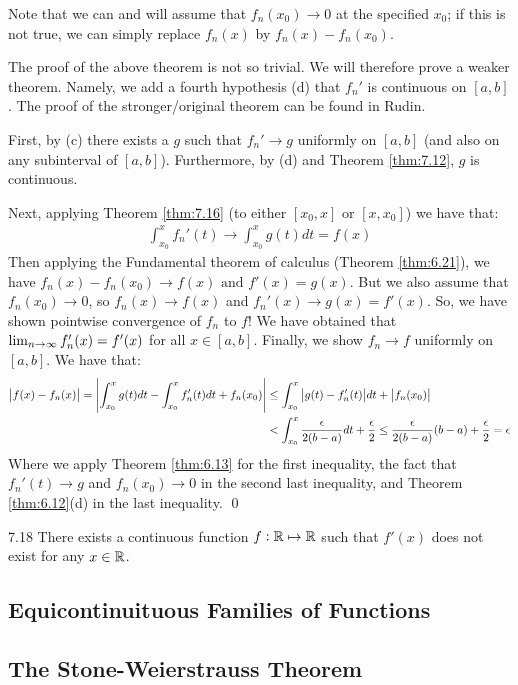 Note that we can and will assume that $f_n(x_0) \rightarrow 0$ at the specified $x_0$; if this is not true, we can simply replace $f_n(x)$ by $f_n(x) - f_n(x_0)$.

\begin{nproof}
    The proof of the above theorem is not so trivial. We will therefore prove a weaker theorem. Namely, we add a fourth hypothesis (d) that $f_n'$ is continuous on $[a, b]$. The proof of the stronger/original theorem can be found in Rudin.
    
    First, by (c) there exists a $g$ such that $f_n' \rightarrow g$ uniformly on $[a, b]$ (and also on any subinterval of $[a, b]$). Furthermore, by (d) and Theorem \ref{thm:7.12}, $g$ is continuous. 
    
    Next, applying Theorem \ref{thm:7.16} (to either $[x_0, x]$ or $[x, x_0]$) we have that:
    \begin{align*}
        \int_{x_0}^x f_n'(t) \rightarrow \int_{x_0}^x g(t) dt = f(x)
    \end{align*}
    Then applying the Fundamental theorem of calculus (Theorem \ref{thm:6.21}), we have $f_n(x) - f_n(x_0) \rightarrow f(x) \text{ and } f'(x) = g(x)$. But we also assume that $f_n(x_0) \rightarrow 0$, so $f_n(x) \rightarrow f(x)$ and $f_n'(x) \rightarrow g(x) = f'(x)$. So, we have shown pointwise convergence of $f_n$ to $f$! We have obtained that $\lim_{n \rightarrow \infty} f_n'(x) = f'(x)$ for all $x \in [a, b]$. Finally, we show $f_n \rightarrow f$ uniformly on $[a, b]$. We have that:
    \begin{align*}
        \abs{f(x) - f_n(x)} = \abs{\int_{x_0}^x g(t)dt - \int_{x_0}^x f_n'(t) dt + f_n(x_0)} &\leq \int_{x_0}^x \abs{g(t) - f_n'(t)}dt + \abs{f_n(x_0)}
        \\ &< \int_{x_0}^x \frac{\epsilon}{2(b-a)}dt + \frac{\epsilon}{2} \leq \frac{\epsilon}{2(b-a)}(b-a) + \frac{\epsilon}{2} = \epsilon
    \end{align*}
    Where we apply Theorem \ref{thm:6.13} for the first inequality, the fact that $f_n'(t) \rightarrow g$ and $f_n(x_0) \rightarrow 0$ in the second last inequality, and Theorem \ref{thm:6.12}(d) in the last inequality. \qed
\end{nproof}

\begin{theorem}{}{7.18}
    There exists a continuous function $f: \mathbb{R} \mapsto \mathbb{R}$ such that $f'(x)$ does not exist for any $x \in \mathbb{R}$.
\end{theorem}

\subsection{Equicontinuituous Families of Functions}

\subsection{The Stone-Weierstrauss Theorem}

